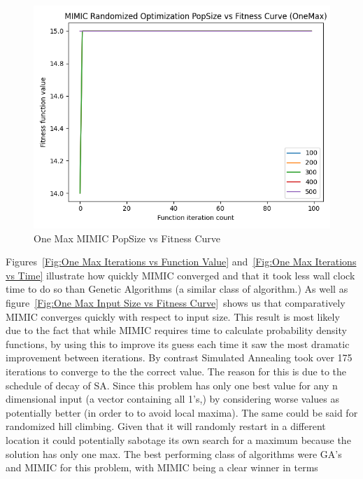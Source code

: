 \documentclass[11pt]{article}
\begin{document}
    \begin{figure}
        \begin{center}
            \includegraphics[width=1\linewidth]{onemaxmimic.png}
            \caption{One Max MIMIC PopSize vs Fitness Curve}\label{Fig:One Max MIMIC PopSize vs Fitness Curve}
        \end{center}
    \end{figure}
    Figures~\ref{Fig:One Max Iterations vs Function Value} and~\ref{Fig:One Max Iterations vs Time} illustrate how quickly MIMIC converged and that it took less wall clock time to do so than Genetic Algorithms
    (a similar class of algorithm.)
    As well as figure~\ref{Fig:One Max Input Size vs Fitness Curve}~shows us that comparatively MIMIC converges quickly
    with respect to input size.
    This result is most likely due to the fact that while MIMIC requires time to calculate probability density functions,
    by using this to improve its guess each time it saw the most dramatic improvement between iterations.
    By contrast Simulated Annealing took over 175 iterations to converge to the the correct value.
    The reason for this is due to the schedule of decay of SA. Since this problem has only one best value for any n
    dimensional input (a vector containing all 1's,) by considering worse values as potentially better (in order to
    to avoid local maxima).
    The same could be said for randomized hill climbing.
    Given that it will randomly restart in a different location it could potentially sabotage its own search for a maximum
    because the solution has only one max.
    The best performing class of algorithms were GA's and MIMIC for this problem, with MIMIC being a clear winner in terms
\end{document}
